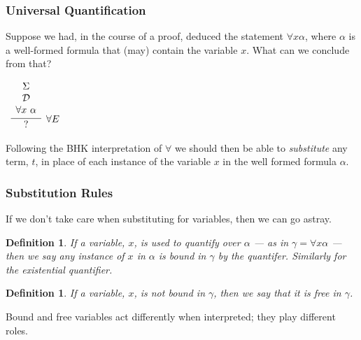 \documentclass{beamer}
\theoremstyle{indentDefn} \newtheorem{defn}[]{Definition}
\begin{document}
\begin{frame}
	\frametitle{Universal Quantification}
	
	Suppose we had, in the course of a proof, deduced the statement $\forall x \alpha$, where $\alpha$ is a well-formed formula that (may) contain the variable $x$. What can we conclude from that? 
	
	\vspace{5mm}
	
	\begin{center}
	$\begin{array}{c}
		\infer[\forall E]{\hspace{0.3cm} ? \hspace{0.3cm}}{\begin{array}{c} 
			\Sigma \\
			\mathcal{D} \\ 
			\forall x \ \alpha			
			\end{array}}
	\end{array}$
	\end{center}

	Following the BHK interpretation of $\forall$ we should then be able to \emph{substitute} any term, $t$, in place of each instance of the variable $x$ in the well formed formula $\alpha$.
\end{frame}

\begin{frame}
	\frametitle{Substitution Rules}
	
	If we don't take care when substituting for variables, then we can go astray. 
	
	\vspace{0.5cm}	

	\begin{defn}
		If a variable, $x$, is used to quantify over $\alpha$ --- as in $\gamma = \forall x \alpha$ --- then we say any instance of $x$ in $\alpha$ is \emph{bound} in $\gamma$ by the quantifer. Similarly for the existential quantifier. 
	\end{defn} 

	
	\vspace{0.5cm} 

	\begin{defn}
		If a variable, $x$, is not bound in $\gamma$, then we say that it is free in $\gamma$.
	\end{defn}

	\vspace{0.5cm} 
	
	Bound and free variables act differently when interpreted; they play different roles. 
	
\end{frame}
\end{document}
